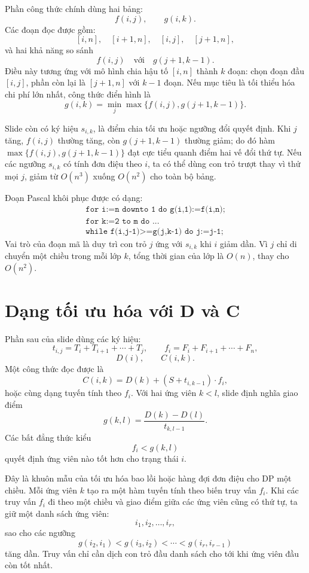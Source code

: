 \documentclass[11pt]{article}
\begin{document}
Phần công thức chính dùng hai bảng:
\[
  f(i,j),\qquad g(i,k).
\]
Các đoạn đọc được gồm:
\[
  [i,n],\quad [i+1,n],\quad [i,j],\quad [j+1,n],
\]
và hai khả năng so sánh
\[
  f(i,j)\quad\text{với}\quad g(j+1,k-1).
\]
Điều này tương ứng với mô hình chia hậu tố \([i,n]\) thành \(k\) đoạn: chọn
đoạn đầu \([i,j]\), phần còn lại là \([j+1,n]\) với \(k-1\) đoạn. Nếu mục
tiêu là tối thiểu hóa chi phí lớn nhất, công thức điển hình là
\[
  g(i,k)=\min_{j}\max\{f(i,j),g(j+1,k-1)\}.
\]

Slide còn có ký hiệu \(s_{i,k}\), là điểm chia tối ưu hoặc ngưỡng đổi quyết
định. Khi \(j\) tăng, \(f(i,j)\) thường tăng, còn \(g(j+1,k-1)\) thường giảm;
do đó hàm \(\max\{f(i,j),g(j+1,k-1)\}\) đạt cực tiểu quanh điểm hai vế đổi
thứ tự. Nếu các ngưỡng \(s_{i,k}\) có tính đơn điệu theo \(i\), ta có thể
dùng con trỏ trượt thay vì thử mọi \(j\), giảm từ \(O(n^3)\) xuống \(O(n^2)\)
cho toàn bộ bảng.

Đoạn Pascal khôi phục được có dạng:
\[
\begin{gathered}
\texttt{for i:=n downto 1 do g(i,1):=f(i,n);}\\
\texttt{for k:=2 to m do ...}\\
\texttt{while f(i,j-1)>=g(j,k-1) do j:=j-1;}
\end{gathered}
\]
Vai trò của đoạn mã là duy trì con trỏ \(j\) ứng với \(s_{i,k}\) khi \(i\)
giảm dần. Vì \(j\) chỉ di chuyển một chiều trong mỗi lớp \(k\), tổng thời
gian của lớp là \(O(n)\), thay cho \(O(n^2)\).

\section{Dạng tối ưu hóa với D và C}

Phần sau của slide dùng các ký hiệu:
\[
  t_{i,j}=T_i+T_{i+1}+\cdots+T_j,\qquad
  f_i=F_i+F_{i+1}+\cdots+F_n,
\]
\[
  D(i),\qquad C(i,k).
\]
Một công thức đọc được là
\[
  C(i,k)=D(k)+(S+t_{i,k-1})\cdot f_i,
\]
hoặc cùng dạng tuyến tính theo \(f_i\). Với hai ứng viên \(k<l\), slide định
nghĩa giao điểm
\[
  g(k,l)=\frac{D(k)-D(l)}{t_{k,l-1}}.
\]
Các bất đẳng thức kiểu
\[
  f_i<g(k,l)
\]
quyết định ứng viên nào tốt hơn cho trạng thái \(i\).

Đây là khuôn mẫu của tối ưu hóa bao lồi hoặc hàng đợi đơn điệu cho DP một
chiều. Mỗi ứng viên \(k\) tạo ra một hàm tuyến tính theo biến truy vấn
\(f_i\). Khi các truy vấn \(f_i\) đi theo một chiều và giao điểm giữa các
ứng viên cũng có thứ tự, ta giữ một danh sách ứng viên:
\[
  i_1,i_2,\ldots,i_r,
\]
sao cho các ngưỡng
\[
  g(i_2,i_1)<g(i_3,i_2)<\cdots<g(i_r,i_{r-1})
\]
tăng dần. Truy vấn chỉ cần dịch con trỏ đầu danh sách cho tới khi ứng viên
đầu còn tốt nhất.
\end{document}
